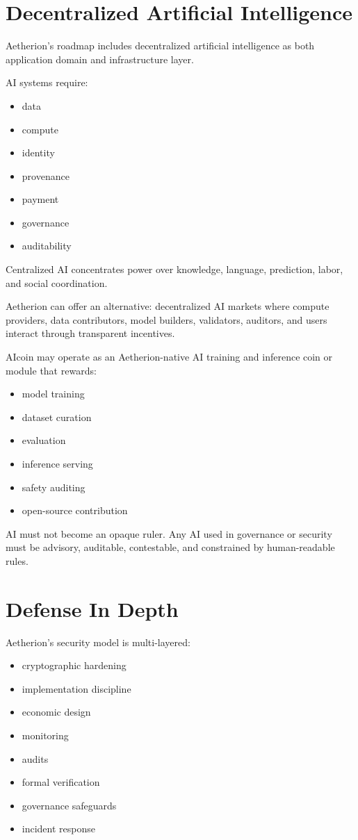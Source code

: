﻿\documentclass[12pt]{article}
\begin{document}
\section{Decentralized Artificial Intelligence}


Aetherion's roadmap includes decentralized artificial intelligence as both application domain and infrastructure layer.

AI systems require:

\begin{itemize}
  \item data
  \item compute
  \item identity
  \item provenance
  \item payment
  \item governance
  \item auditability
\end{itemize}

Centralized AI concentrates power over knowledge, language, prediction, labor, and social coordination.

Aetherion can offer an alternative: decentralized AI markets where compute providers, data contributors, model builders, validators, auditors, and users interact through transparent incentives.

AIcoin may operate as an Aetherion-native AI training and inference coin or module that rewards:

\begin{itemize}
  \item model training
  \item dataset curation
  \item evaluation
  \item inference serving
  \item safety auditing
  \item open-source contribution
\end{itemize}

AI must not become an opaque ruler. Any AI used in governance or security must be advisory, auditable, contestable, and constrained by human-readable rules.

\section{Defense In Depth}


Aetherion's security model is multi-layered:

\begin{itemize}
  \item cryptographic hardening
  \item implementation discipline
  \item economic design
  \item monitoring
  \item audits
  \item formal verification
  \item governance safeguards
  \item incident response
\end{itemize}
\end{document}
